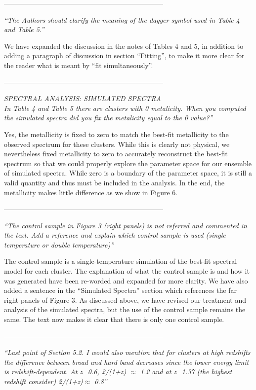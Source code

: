 \documentclass[11pt]{article}
\begin{document}
---------------------------------------------------------------------

\textit{
``The Authors should clarify the meaning of the dagger symbol used in
Table 4 and Table 5.''
}

We have expanded the discussion in the notes of Tables 4 and 5, in
addition to adding a paragraph of discussion in section ``Fitting'',
to make it more clear for the reader what is meant by ``fit
simultaneously''.

---------------------------------------------------------------------

\textit{
{SPECTRAL ANALYSIS: SIMULATED SPECTRA}\\
In Table 4 and Table 5 there are clusters with 0 metalicity. When you
computed the simulated spectra did you fix the metalicity equal to the
0 value?''
}

Yes, the metallicity is fixed to zero to match the best-fit
metallicity to the observed spectrum for these clusters. While this is
clearly not physical, we nevertheless fixed metallicity to zero to
accurately reconstruct the best-fit spectrum so that we could properly
explore the parameter space for our ensemble of simulated
spectra. While zero is a boundary of the parameter space, it is still
a valid quantity and thus must be included in the analysis. In the
end, the metallicity makes little difference as we show in Figure 6.

---------------------------------------------------------------------

\textit{
``The control sample in Figure 3 (right panels) is not referred and
commented in the text.  Add a reference and explain which control
sample is used (single temperature or double temperature)''
}

The control sample is a single-temperature simulation of the best-fit
spectral model for each cluster. The explanation of what the control
sample is and how it was generated have been re-worded and expanded
for more clarity. We have also added a sentence in the ``Simulated
Spectra'' section which references the far right panels of Figure
3. As discussed above, we have revised our treatment and analysis of
the simulated spectra, but the use of the control sample remains the
same. The text now makes it clear that there is only one control
sample.

---------------------------------------------------------------------

\textit{
``Last point of Section 5.2. I would also mention that for clusters at
high redshifts the difference between broad and hard band decreases
since the lower energy limit is redshift-dependent. At z=0.6, 2/(1+z)
$\approx$ 1.2 and at z=1.37 (the highest redshift consider)
2/(1+z)$\approx$ 0.8''
}
\end{document}
